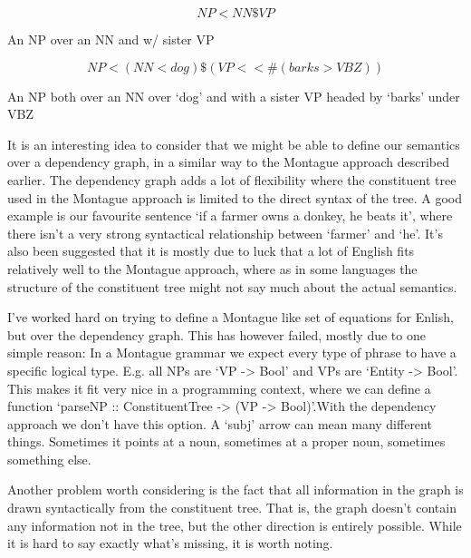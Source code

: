 \documentclass[12pt]{article}
\begin{document}
\begin{equation}
NP < NN \$ VP
\end{equation}

An NP over an NN and w/ sister VP

\begin{equation}
NP < (NN < dog) \$ (VP <<\# (barks > VBZ))
\end{equation}

An NP both over an NN over `dog' and with
a sister VP headed by `barks' under VBZ



It is an interesting idea to consider that we might be able to define our semantics over a dependency graph, in a similar way to the Montague approach described earlier. The dependency graph adds a lot of flexibility where the constituent tree used in the Montague approach is limited to the direct syntax of the tree. A good example is our favourite sentence `if a farmer owns a donkey, he beats it', where there isn't a very strong syntactical relationship between `farmer' and `he'. It's also been suggested that it is mostly due to luck that a lot of English fits relatively well to the Montague approach, where as in some languages the structure of the constituent tree might not say much about the actual semantics.

I've worked hard on trying to define a Montague like set of equations for Enlish, but over the dependency graph. This has however failed, mostly due to one simple reason: In a Montague grammar we expect every type of phrase to have a specific logical type. E.g. all NPs are `VP -> Bool' and VPs are `Entity -> Bool'. This makes it fit very nice in a programming context, where we can define a function `parseNP :: ConstituentTree -> (VP -> Bool)'.With the dependency approach we don't have this option. A `subj' arrow can mean many different things. Sometimes it points at a noun, sometimes at a proper noun, sometimes something else.

Another problem worth considering is the fact that all information in the graph is drawn syntactically from the constituent tree. That is, the graph doesn't contain any information not in the tree, but the other direction is entirely possible. While it is hard to say exactly what's missing, it is worth noting.
\end{document}
